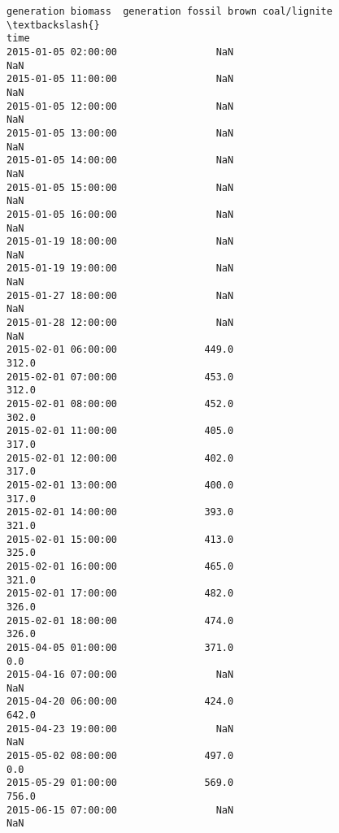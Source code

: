 \documentclass[11pt]{article}
\makeatletter
\newcommand{\boxspacing}{\kern\kvtcb@left@rule\kern\kvtcb@boxsep}
\newcommand{\prompt}[4]{
        {\ttfamily\llap{{\color{#2}[#3]:\hspace{3pt}#4}}\vspace{-\baselineskip}}
    }
\makeatother
\begin{document}
            \begin{tcolorbox}[breakable, size=fbox, boxrule=.5pt, pad at break*=1mm, opacityfill=0]
\prompt{Out}{outcolor}{13}{\boxspacing}
\begin{Verbatim}[commandchars=\\\{\}]
                     generation biomass  generation fossil brown coal/lignite  \textbackslash{}
time
2015-01-05 02:00:00                 NaN                                   NaN
2015-01-05 11:00:00                 NaN                                   NaN
2015-01-05 12:00:00                 NaN                                   NaN
2015-01-05 13:00:00                 NaN                                   NaN
2015-01-05 14:00:00                 NaN                                   NaN
2015-01-05 15:00:00                 NaN                                   NaN
2015-01-05 16:00:00                 NaN                                   NaN
2015-01-19 18:00:00                 NaN                                   NaN
2015-01-19 19:00:00                 NaN                                   NaN
2015-01-27 18:00:00                 NaN                                   NaN
2015-01-28 12:00:00                 NaN                                   NaN
2015-02-01 06:00:00               449.0                                 312.0
2015-02-01 07:00:00               453.0                                 312.0
2015-02-01 08:00:00               452.0                                 302.0
2015-02-01 11:00:00               405.0                                 317.0
2015-02-01 12:00:00               402.0                                 317.0
2015-02-01 13:00:00               400.0                                 317.0
2015-02-01 14:00:00               393.0                                 321.0
2015-02-01 15:00:00               413.0                                 325.0
2015-02-01 16:00:00               465.0                                 321.0
2015-02-01 17:00:00               482.0                                 326.0
2015-02-01 18:00:00               474.0                                 326.0
2015-04-05 01:00:00               371.0                                   0.0
2015-04-16 07:00:00                 NaN                                   NaN
2015-04-20 06:00:00               424.0                                 642.0
2015-04-23 19:00:00                 NaN                                   NaN
2015-05-02 08:00:00               497.0                                   0.0
2015-05-29 01:00:00               569.0                                 756.0
2015-06-15 07:00:00                 NaN                                   NaN

\end{Verbatim}
\end{tcolorbox}
\end{document}
